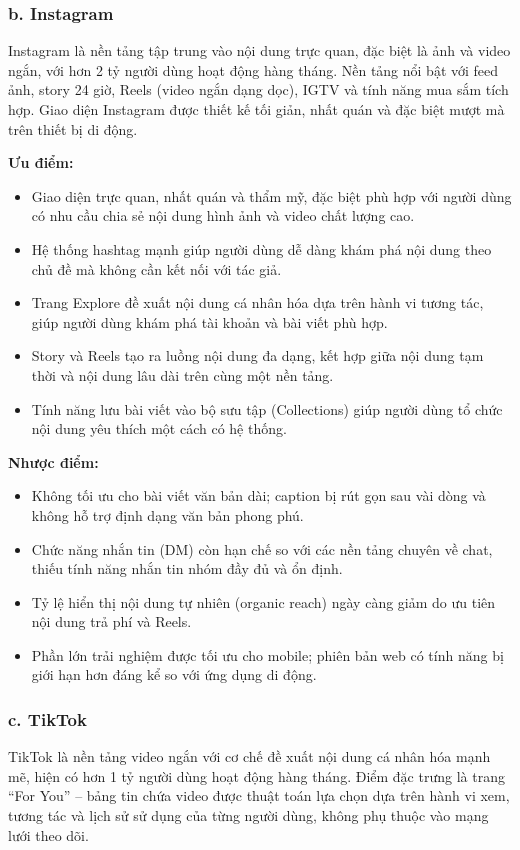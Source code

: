 \documentclass[../DoAn.tex]{subfiles}
\begin{document}
\subsubsection*{b. Instagram}
Instagram là nền tảng tập trung vào nội dung trực quan, đặc biệt là ảnh và video ngắn, với hơn 2 tỷ người dùng hoạt động hàng tháng. Nền tảng nổi bật với feed ảnh, story 24 giờ, Reels (video ngắn dạng dọc), IGTV và tính năng mua sắm tích hợp. Giao diện Instagram được thiết kế tối giản, nhất quán và đặc biệt mượt mà trên thiết bị di động.

\noindent\textbf{Ưu điểm:}
\begin{itemize}
    \item Giao diện trực quan, nhất quán và thẩm mỹ, đặc biệt phù hợp với người dùng có nhu cầu chia sẻ nội dung hình ảnh và video chất lượng cao.
    \item Hệ thống hashtag mạnh giúp người dùng dễ dàng khám phá nội dung theo chủ đề mà không cần kết nối với tác giả.
    \item Trang Explore đề xuất nội dung cá nhân hóa dựa trên hành vi tương tác, giúp người dùng khám phá tài khoản và bài viết phù hợp.
    \item Story và Reels tạo ra luồng nội dung đa dạng, kết hợp giữa nội dung tạm thời và nội dung lâu dài trên cùng một nền tảng.
    \item Tính năng lưu bài viết vào bộ sưu tập (Collections) giúp người dùng tổ chức nội dung yêu thích một cách có hệ thống.
\end{itemize}

\noindent\textbf{Nhược điểm:}
\begin{itemize}
    \item Không tối ưu cho bài viết văn bản dài; caption bị rút gọn sau vài dòng và không hỗ trợ định dạng văn bản phong phú.
    \item Chức năng nhắn tin (DM) còn hạn chế so với các nền tảng chuyên về chat, thiếu tính năng nhắn tin nhóm đầy đủ và ổn định.
    \item Tỷ lệ hiển thị nội dung tự nhiên (organic reach) ngày càng giảm do ưu tiên nội dung trả phí và Reels.
    \item Phần lớn trải nghiệm được tối ưu cho mobile; phiên bản web có tính năng bị giới hạn hơn đáng kể so với ứng dụng di động.
\end{itemize}

\subsubsection*{c. TikTok}
TikTok là nền tảng video ngắn với cơ chế đề xuất nội dung cá nhân hóa mạnh mẽ, hiện có hơn 1 tỷ người dùng hoạt động hàng tháng. Điểm đặc trưng là trang ``For You'' -- bảng tin chứa video được thuật toán lựa chọn dựa trên hành vi xem, tương tác và lịch sử sử dụng của từng người dùng, không phụ thuộc vào mạng lưới theo dõi.
\end{document}
